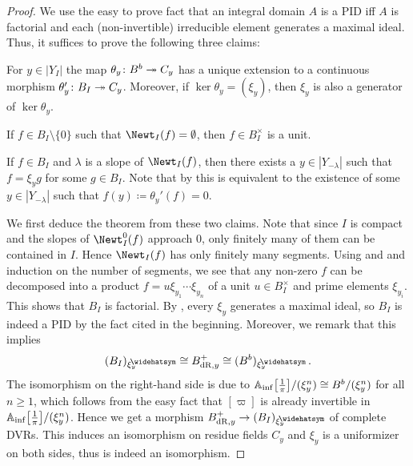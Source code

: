 \documentclass[a4paper, 10pt, oneside, DIV=9, chapterprefix=true, numbers=enddot,bibliography=totoc]{scrbook}
\begin{document}
\begin{proof}
	We use the easy to prove fact that an integral domain $A$ is a PID iff $A$ is factorial and each (non-invertible) irreducible element generates a maximal ideal. Thus, it suffices to prove the following three claims:
	\begin{numerate}
		\item For $y\in |Y_I|$ the map $\theta_y\colon B^b\epimorphism C_y$ has a unique extension to a continuous morphism $\theta_y'\colon B_I\epimorphism C_y$. Moreover, if $\ker \theta_y=(\xi_y)$, then $\xi_y$ is also a generator of $\ker\theta_y$.
		\item If $f\in B_I\setminus\{0\}$ such that $\Newt_I(f)=\emptyset$, then $f\in B_I^\times$ is a unit.
		\item If $f\in B_I$ and $\lambda$ is a slope of $\Newt_I(f)$, then there exists a $y\in|Y_{-\lambda}|$ such that $f=\xi_yg$ for some $g\in B_I$. Note that by  this is equivalent to the existence of some $y\in |Y_{-\lambda}|$ such that $f(y)\coloneqq\theta_y'(f)=0$.
	\end{numerate}
	We first deduce the theorem from these two claims. Note that since $I$ is compact and the slopes of $\Newt_I^0(f)$ approach $0$, only finitely many of them can be contained in $I$. Hence $\Newt_I(f)$ has only finitely many segments. Using  and  and induction on the number of segments, we see that any non-zero $f$ can be decomposed into a product $f=u\xi_{y_1}\dotsm\xi_{y_n}$ of a unit $u\in B_I^\times$ and prime elements $\xi_{y_i}$. This shows that $B_I$ is factorial. By , every $\xi_y$ generates a maximal ideal, so $B_I$ is indeed a PID by the fact cited in the beginning. Moreover, we remark that this implies
	\begin{equation*}
		(B_I)_{\xi_y}^\complete\cong B_{\dR,y}^+\cong(B^b)_{\xi_y}^\complete\,.
	\end{equation*}
	The isomorphism on the right-hand side is due to $\mathbb{A}_{\mathrm{inf}}\big[\textstyle\frac{1}{\pi}\big]/(\xi_y^n)\cong B^b/(\xi_y^n)$ for all $n\geq 1$, which follows from the easy fact that $[\varpi]$ is already invertible in $\mathbb{A}_{\mathrm{inf}}\big[\textstyle\frac{1}{\pi}\big]/(\xi_y^n)$. Hence we get a morphism $B_{\dR,y}^+\morphism (B_I)_{\xi_y}^\complete$ of complete DVRs. This induces an isomorphism on residue fields $C_y$ and $\xi_y$ is a uniformizer on both sides, thus is indeed an isomorphism.



\end{proof}
\end{document}
